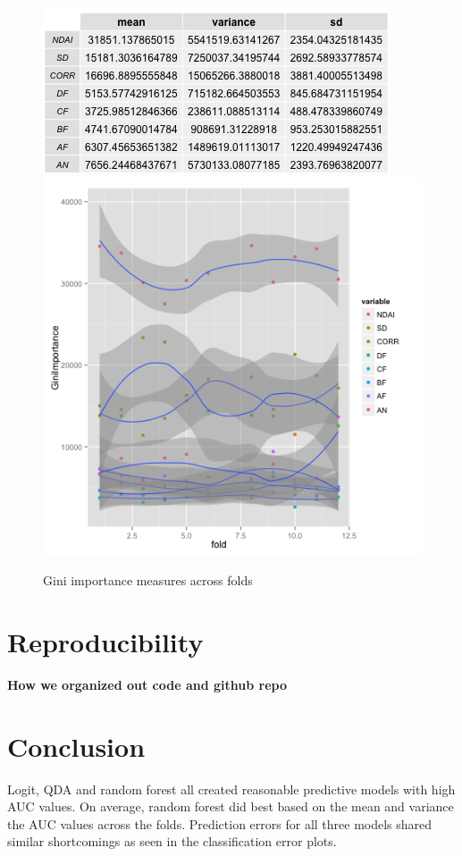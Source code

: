 \documentclass{article}\usepackage[]{graphicx}\usepackage[]{color}
\begin{document}
  \begin{figure}[H]
  \includegraphics[width=\linewidth, height = 140pts ]{Gini_mean_sd.png}
\endminipage\hfill
{}
  \includegraphics[width=\linewidth, height = 180pts]{Gini_importance.png}
\endminipage\hfill
  \caption{Gini importance measures across folds}\label{}
\end{figure}


\section{Reproducibility}

{\bf How we organized out code and github repo}

\section{Conclusion} 
Logit, QDA and random forest all created reasonable predictive models with high AUC values.  On average, random forest did best based on the mean and variance the AUC values across the folds.  Prediction errors for all three models shared similar shortcomings as seen in the classification error plots.  
 \begin{thebibliography}{1}

\end{thebibliography}
\end{document}
